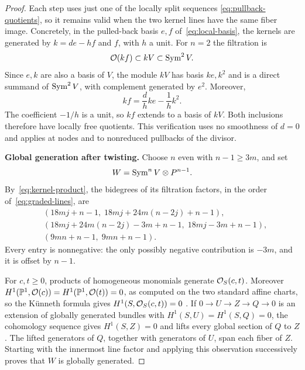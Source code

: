\begin{proof}
Each step uses just one of the locally split sequences
\eqref{eq:pullback-quotients}, so it remains valid when the two kernel
lines have the same fiber image. Concretely, in the pulled-back basis
$e,f$ of~\eqref{eq:local-basis}, the kernels are generated by
$k=de-hf$ and $f$, with $h$ a unit. For $n=2$ the filtration is
\[
 \mathcal O(kf)\subset kV\subset\operatorname{Sym}^2V.
\]
Since $e,k$ are also a basis of $V$, the module $kV$ has basis
$ke,k^2$ and is a direct summand of $\operatorname{Sym}^2V$, with complement
generated by $e^2$. Moreover,
\[
 kf=\frac{d}{h}ke-\frac1h k^2.
\]
The coefficient $-1/h$ is a unit, so $kf$ extends to a basis of $kV$.
Both inclusions therefore have locally free quotients.
This verification uses no smoothness of $d=0$ and applies at nodes
and to nonreduced pullbacks of the divisor.

\smallskip\noindent\textbf{Global generation after twisting.}
Choose $n$ even with $n-1\geq3m$, and set
\begin{equation}\label{eq:generated-symmetric-power}
 W=\operatorname{Sym}^n V\otimes P^{n-1}.
\end{equation}
By~\eqref{eq:kernel-product}, the bidegrees of its filtration
factors, in the order of~\eqref{eq:graded-lines}, are
\begin{align*}
 &(18mj+n-1,\;18mj+24m(n-2j)+n-1),\\
 &(18mj+24m(n-2j)-3m+n-1,\;18mj-3m+n-1),\\
 &(9mn+n-1,\;9mn+n-1).
\end{align*}
Every entry is nonnegative: the only possibly negative contribution
is $-3m$, and it is offset by $n-1$.

For $c,t\geq0$, products of homogeneous monomials generate
$\mathcal O_S(c,t)$. Moreover $H^1(\mathbb P^1,\mathcal O(c))=H^1(\mathbb P^1,\mathcal O(t))=0$, as
computed on the two standard affine charts, so the K\"unneth formula
gives $H^1(S,\mathcal O_S(c,t))=0$
\cite[Tags~01XD and~0BED]{StacksProject}.
If $0\to U\to Z\to Q\to0$ is an extension of globally generated
bundles with $H^1(S,U)=H^1(S,Q)=0$, the cohomology sequence gives
$H^1(S,Z)=0$ and lifts every global section of $Q$ to $Z$.
The lifted generators of $Q$, together with generators of $U$,
span each fiber of $Z$. Starting with the innermost line factor and
applying this observation successively proves that $W$ is globally
generated.


\end{proof}
